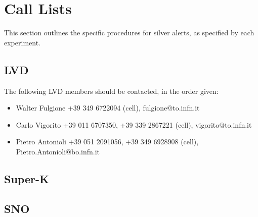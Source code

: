 \documentclass{article}
\begin{document}
\section{Call Lists}      

This section outlines the specific procedures for silver alerts, as
specified by each experiment.

\subsection{LVD}

The following LVD members should be contacted, in the order given:

\begin{itemize}
\item Walter Fulgione +39 349 6722094 (cell), fulgione@to.infn.it

\item Carlo Vigorito +39 011 6707350, +39 339 2867221 (cell), vigorito@to.infn.it

\item Pietro Antonioli +39 051 2091056, +39 349 6928908 (cell), Pietro.Antonioli@bo.infn.it
\end{itemize}

\subsection{Super-K}


\subsection{SNO}
\end{document}
